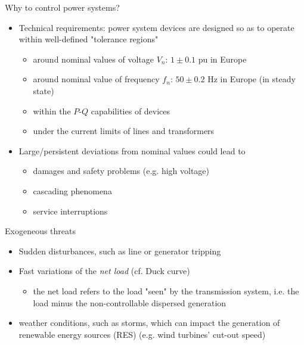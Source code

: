 \begin{frame}{Why to control power systems?}
  \begin{itemize}
      \item Technical requirements: power system devices are designed so as to operate within well-defined "tolerance regions" 
      \begin{itemize}
        \item around nominal values of voltage $V_n$: $1 \pm 0.1$ pu in Europe
        \item around nominal value of frequency $f_n$: $50 \pm 0.2$  Hz in Europe (in steady state)
        \item within the $P$-$Q$ capabilities of devices
        \item under the current limits of lines and transformers
      \end{itemize} 
      \item Large/persistent deviations from nominal values could lead to 
      \begin{itemize}
        \item damages and safety problems (e.g. high voltage)
        \item cascading phenomena
        \item service interruptions
      \end{itemize}
      
  \end{itemize}
\end{frame}

\begin{frame}{Exogeneous threats}
  \begin{itemize}
      \item Sudden disturbances, such as line or generator tripping
      \item Fast variations of the \textit{net load} (cf. Duck curve)
      \begin{itemize}
        \item the net load refers to the load "seen" by the transmission system, i.e. the load minus the non-controllable dispersed generation
      \end{itemize}
      \item weather conditions, such as storms, which can impact the generation of renewable energy sources (RES) (e.g. wind turbines' cut-out speed)
  \end{itemize}
\end{frame}

